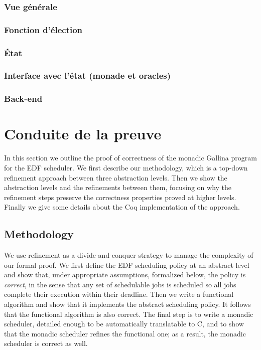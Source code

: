 			\subsubsection{Vue générale}
			\subsubsection{Fonction d'élection}
			\subsubsection{État}
			\subsubsection{Interface avec l'état (monade et oracles)}
			\subsubsection{Back-end}

		
	\section{Conduite de la preuve}

	\label{sec:proof}
	In this section we outline the proof of correctness of the monadic Gallina program for the EDF scheduler.
	We first describe our methodology, which is a top-down refinement approach between three abstraction levels. Then we show the abstraction levels and the refinements between them, focusing on why the refinement steps preserve the correctness properties proved at higher levels. Finally we give some details about the Coq implementation of the approach.


	\subsection{Methodology}

	We use refinement %
	as a divide-and-conquer strategy to manage the complexity of our formal proof.
	We first define the EDF scheduling policy at an abstract level and show that,
	under appropriate assumptions, formalized below, the policy is \emph{correct},
	in the sense that any set of schedulable jobs is scheduled so all jobs complete
	their execution within their deadline. Then we write a functional algorithm and
	show that it implements the abstract scheduling policy. It follows that the functional
	algorithm is also correct. The final step is to write a monadic scheduler,
	detailed enough to be automatically translatable to C, and to show that
	the monadic scheduler refines the functional one; as a result, the monadic scheduler is correct as well.

